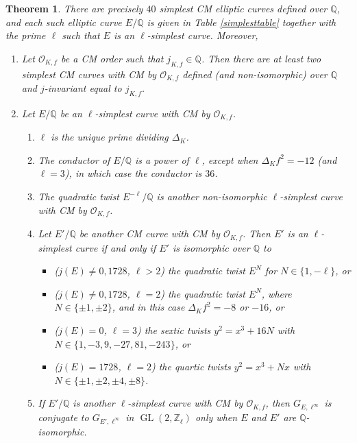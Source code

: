 \documentclass[11pt]{amsart}
\newtheorem{theorem}[defn]{Theorem}
\theoremstyle{definition}
\newcommand{\Q}{\mathbb{Q}}
\newcommand{\Z}{\mathbb{Z}}
\newcommand{\Of}{\mathcal{O}_{K,f}}
\newcommand{\GL}{\operatorname{GL}}
\begin{document}
\begin{theorem}\label{thm-40simplestcurves}\label{lem-TwistsPreservingSimplestCM}\label{thm-TwistsPreservingSimplestCM}
    There are precisely $40$ simplest CM elliptic curves defined over $\Q$, and each such elliptic curve $E/\Q$ is given in Table \ref{simplesttable} together with the prime $\ell$ such that $E$ is an $\ell$-simplest curve. Moreover,
    \begin{enumerate}
        \item Let $\Of$ be a CM order such that $j_{K,f}\in \Q$. Then there are at least two simplest CM curves with CM by $\Of$ defined (and non-isomorphic) over $\Q$ and $j$-invariant equal to $j_{K,f}$.
        \item Let $E/\Q$ be an $\ell$-simplest curve with CM by $\Of$.
        \begin{enumerate} 
        \item $\ell$ is the unique prime dividing $\Delta_K$.
        \item The conductor of $E/\Q$ is a power of $\ell$, except when $\Delta_K f^2 = -12$ (and $\ell=3$), in which case the conductor is $36$.
        \item The quadratic twist $E^{-\ell}/\Q$ is another non-isomorphic $\ell$-simplest curve with CM by $\Of$.
        \item Let $E'/\Q$ be another CM curve with CM by $\Of$. Then $E'$ is an $\ell$-simplest curve if and only if $E'$ is isomorphic over $\Q$  to 
        \begin{itemize}
            \item ($j(E)\neq 0,1728$, $\ell>2$) the quadratic twist $E^{N}$ for $N\in \{1,-\ell\}$, or
            \item ($j(E)\neq 0,1728$, $\ell=2$) the quadratic twist $E^{N}$, where $N \in \{\pm 1, \pm 2\}$, and in this case $\Delta_Kf^2 = -8$ or $-16$, or
                       \item ($j(E)=0$, $\ell=3$) the sextic twists $y^2 = x^3 + 16N$ with $N\in \{1,-3,9,-27,81,-243 \}$, or
            \item ($j(E)=1728$, $\ell=2$) the quartic twists $y^2=x^3+Nx$ with $N\in \{\pm 1, \pm 2, \pm 4, \pm 8\}$.
 
        \end{itemize}
        \item If $E'/\Q$ is another $\ell$-simplest curve with CM by $\Of$, then $G_{E, \ell^{\infty}}$ is conjugate to $G_{E', \ell^{\infty}}$ in $\GL(2, \Z_{\ell})$ only when $E$ and $E'$ are $\Q$-isomorphic.
        \end{enumerate}
    \end{enumerate}
\end{theorem}
\end{document}
